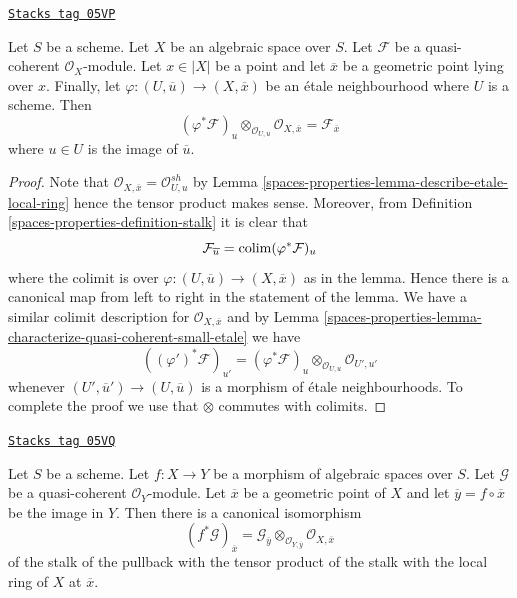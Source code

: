\begin{lemma}
\label{spaces-properties-lemma-stalk-quasi-coherent}
\href{https://stacks.math.columbia.edu/tag/05VP}{\texttt{Stacks tag 05VP}}

Let $S$ be a scheme.
Let $X$ be an algebraic space over $S$.
Let $\mathcal{F}$ be a quasi-coherent $\mathcal{O}_X$-module.
Let $x \in |X|$ be a point and let $\overline{x}$ be a geometric
point lying over $x$. Finally, let
$\varphi : (U, \overline{u}) \to (X, \overline{x})$
be an \'etale neighbourhood where $U$ is a scheme.
Then
$$
(\varphi^*\mathcal{F})_u \otimes_{\mathcal{O}_{U, u}}
\mathcal{O}_{X, \overline{x}} =
\mathcal{F}_{\overline{x}}
$$
where $u \in U$ is the image of $\overline{u}$.
\end{lemma}

\begin{proof}
Note that $\mathcal{O}_{X, \overline{x}} = \mathcal{O}_{U, u}^{sh}$ by
Lemma \ref{spaces-properties-lemma-describe-etale-local-ring}
hence the tensor product makes sense. Moreover, from
Definition \ref{spaces-properties-definition-stalk}
it is clear that
$$
\mathcal{F}_{\overline{u}} = \operatorname{colim} (\varphi^*\mathcal{F})_u
$$
where the colimit is over $\varphi : (U, \overline{u}) \to (X, \overline{x})$
as in the lemma. Hence there is a canonical map from left to right in
the statement of the lemma. We have a similar colimit description for
$\mathcal{O}_{X, \overline{x}}$
and by
Lemma \ref{spaces-properties-lemma-characterize-quasi-coherent-small-etale}
we have
$$
((\varphi')^*\mathcal{F})_{u'} =
(\varphi^*\mathcal{F})_u \otimes_{\mathcal{O}_{U, u}} \mathcal{O}_{U', u'}
$$
whenever $(U', \overline{u}') \to (U, \overline{u})$ is a morphism of
\'etale neighbourhoods. To complete the proof we use that
$\otimes$ commutes with colimits.
\end{proof}

\begin{lemma}
\label{spaces-properties-lemma-stalk-pullback-quasi-coherent}
\href{https://stacks.math.columbia.edu/tag/05VQ}{\texttt{Stacks tag 05VQ}}

Let $S$ be a scheme. Let $f : X \to Y$ be a morphism of algebraic spaces
over $S$. Let $\mathcal{G}$ be a quasi-coherent $\mathcal{O}_Y$-module.
Let $\overline{x}$ be a geometric point of $X$ and let
$\overline{y} = f \circ \overline{x}$ be the image in $Y$.
Then there is a canonical isomorphism
$$
(f^*\mathcal{G})_{\overline{x}} =
\mathcal{G}_{\overline{y}} \otimes_{\mathcal{O}_{Y, \overline{y}}}
\mathcal{O}_{X, \overline{x}}
$$
of the stalk of the pullback with the tensor product of the stalk
with the local ring of $X$ at $\overline{x}$.
\end{lemma}

